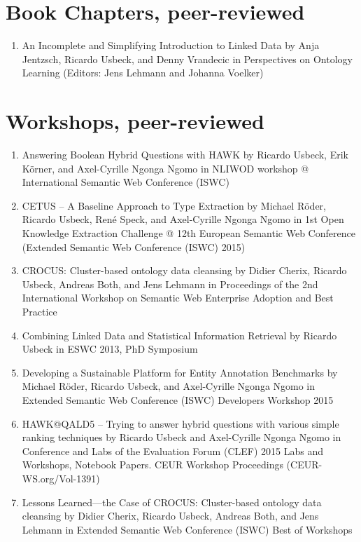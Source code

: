 \section*{Book Chapters, peer-reviewed}
\begin{enumerate}[resume]
\item An Incomplete and Simplifying Introduction to Linked Data by Anja Jentzsch, Ricardo Usbeck, and Denny Vrandecic in Perspectives on Ontology Learning (Editors: Jens Lehmann and Johanna Voelker) 
\end{enumerate}


\section*{Workshops, peer-reviewed}
\begin{enumerate}[resume]
    \item Answering Boolean Hybrid Questions with HAWK by Ricardo Usbeck, Erik Körner, and Axel-Cyrille Ngonga Ngomo in NLIWOD workshop @ International Semantic Web Conference (ISWC)
    \item CETUS -- A Baseline Approach to Type Extraction by Michael Röder, Ricardo Usbeck, René Speck, and Axel-Cyrille Ngonga Ngomo in 1st Open Knowledge Extraction Challenge @ 12th European Semantic Web Conference (Extended Semantic Web Conference (ISWC) 2015) 
    \item CROCUS: Cluster-based ontology data cleansing by Didier Cherix, Ricardo Usbeck, Andreas Both, and Jens Lehmann in Proceedings of the 2nd International Workshop on Semantic Web Enterprise Adoption and Best Practice 
    \item Combining Linked Data and Statistical Information Retrieval by Ricardo Usbeck in ESWC 2013, PhD Symposium  
    \item Developing a Sustainable Platform for Entity Annotation Benchmarks by Michael Röder, Ricardo Usbeck, and Axel-Cyrille Ngonga Ngomo in Extended Semantic Web Conference (ISWC) Developers Workshop 2015
    \item HAWK@QALD5 -- Trying to answer hybrid questions with various simple ranking techniques by Ricardo Usbeck and Axel-Cyrille Ngonga Ngomo in Conference and Labs of the Evaluation Forum (CLEF) 2015 Labs and Workshops, Notebook Papers. CEUR Workshop Proceedings (CEUR-WS.org/Vol-1391) 
    \item Lessons Learned---the Case of CROCUS: Cluster-based ontology data cleansing by Didier Cherix, Ricardo Usbeck, Andreas Both, and Jens Lehmann in Extended Semantic Web Conference (ISWC) Best of Workshops 
\end{enumerate}


